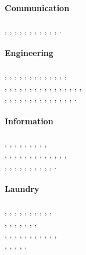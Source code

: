 \documentclass{article}
\begin{document}
\paragraph{Communication}
\Pickup,
\Letter,
\Mobilefone,
\Telefon,
\fax,
\FAX,
\Fax,
\Faxmachine,
\Email,
\Lightning,
\EmailCT,
\Emailct.

\paragraph{Engineering}
\Beam,
\Bearing,
\LooseBearing,
\Loosebearing,
\FixedBearing,
\Fixedbearing,
\LeftTorque,
\Lefttorque,
\RightTorque,
\Righttorque,
\Lineload,
\MVArrowDown,
\Force,
\\
\Octosteel,
\OktoSteel,
\HexaSteel,
\Hexasteel,
\SquareSteel,
\Squaresteel,
\RectSteel,
\Rectsteel,
\CircSteel,
\Circsteel,
\SquarePipe,
\Squarepipe,
\RectPipe,
\Rectpipe,
\CircPipe,
\Circpipe,
\\
\LSteel,
\Lsteel,
\RoundedLSteel,
\RoundedLsteel,
\TSteel,
\Tsteel,
\RoundedTSteel,
\RoundedTsteel,
\TTSteel,
\TTsteel,
\RoundedTTSteel,
\RoundedTTsteel,
\FlatSteel,
\Flatsteel,
\Valve.

\paragraph{Information}
\Industry,
\Coffeecup,
\LeftScissors,
\Leftscissors,
\CuttingLine,
\RightScissors,
\Rightscissors,
\Football,
\Bicycle,
\\
\Info,
\ClockLogo,
\Clocklogo,
\CutRight,
\Cutright,
\CutLine,
\Cutline,
\Kutline,
\CutLeft,
\Cutleft,
\Wheelchair,
\Gentsroom,
\Ladiesroom,
\\
\Checkedbox,
\CrossedBox,
\Crossedbox,
\HollowBox,
\PointingHand,
\Pointinghand,
\WritingHand,
\Writinghand,
\MineSign,
\Recycling,
\PackingWaste.

\paragraph{Laundry}
\WashCotton,
\WashSynthetics,
\WashWool,
\HandWash,
\Handwash,
\NoWash,
\Dontwash,
\Tumbler,
\NoTumbler,
\NoChemicalCleaning,
\\
\Bleech,
\NoBleech,
\CleaningA,
\CleaningP,
\CleaningPP,
\CleaningF,
\CleaningFF,
\\
\Ironing,
\ironing,
\IRONING,
\IroningI,
\IroningII,
\IroningIII,
\NoIroning,
\AtNinetyFive,
\ShortNinetyFive,
\AtSixty,
\ShortSixty,
\\
\ShortFifty,
\AtForty,
\ShortForty,
\SpecialForty,
\ShortThirty.
\end{document}
